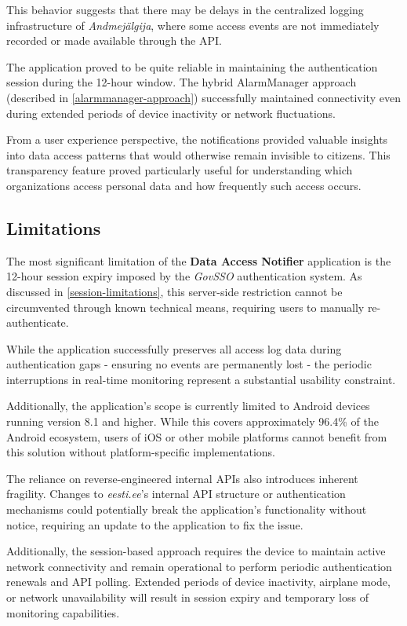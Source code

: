 This behavior suggests that there may be delays in the centralized logging infrastructure of \textit{Andmejälgija}, where some access events are not immediately recorded or made available through the API.

The application proved to be quite reliable in maintaining the authentication session during the 12-hour window. The hybrid AlarmManager approach (described in \ref{alarmmanager-approach}) successfully maintained connectivity even during extended periods of device inactivity or network fluctuations.

From a user experience perspective, the notifications provided valuable insights into data access patterns that would otherwise remain invisible to citizens. This transparency feature proved particularly useful for understanding which organizations access personal data and how frequently such access occurs.

\subsection{Limitations}
The most significant limitation of the \textbf{Data Access Notifier} application is the 12-hour session expiry imposed by the \textit{GovSSO} authentication system. As discussed in \ref{session-limitations}, this server-side restriction cannot be circumvented through known technical means, requiring users to manually re-authenticate.

While the application successfully preserves all access log data during authentication gaps - ensuring no events are permanently lost - the periodic interruptions in real-time monitoring represent a substantial usability constraint.

Additionally, the application's scope is currently limited to Android devices running version 8.1 and higher. While this covers approximately 96.4\% of the Android ecosystem, users of iOS or other mobile platforms cannot benefit from this solution without platform-specific implementations.

The reliance on reverse-engineered internal APIs also introduces inherent fragility. Changes to \textit{eesti.ee}'s internal API structure or authentication mechanisms could potentially break the application's functionality without notice, requiring an update to the application to fix the issue.

Additionally, the session-based approach requires the device to maintain active network connectivity and remain operational to perform periodic authentication renewals and API polling. Extended periods of device inactivity, airplane mode, or network unavailability will result in session expiry and temporary loss of monitoring capabilities.


